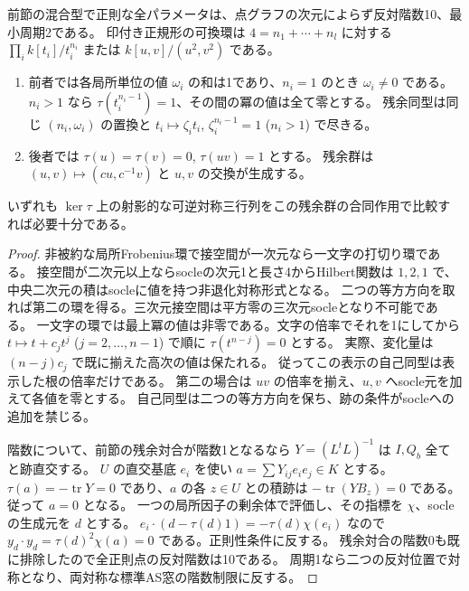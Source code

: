 \begin{proposition}\label{prop:mixed-quartic-normal-forms}
前節の混合型で正則な全パラメータは、点グラフの次元によらず反対階数10、最小周期2である。
印付き正規形の可換環は $4=n_1+\cdots+n_l$ に対する
$\prod_i k[t_i]/t_i^{n_i}$ または $k[u,v]/(u^2,v^2)$ である。
\begin{enumerate}
\item 前者では各局所単位の値 $\omega_i$ の和は1であり、$n_i=1$ のとき $\omega_i\ne0$ である。
$n_i>1$ なら $\tau(t_i^{n_i-1})=1$、その間の冪の値は全て零とする。
残余同型は同じ $(n_i,\omega_i)$ の置換と $t_i\mapsto\zeta_i t_i$, $\zeta_i^{n_i-1}=1$ ($n_i>1$) で尽きる。
\item 後者では $\tau(u)=\tau(v)=0$, $\tau(uv)=1$ とする。
残余群は $(u,v)\mapsto(cu,c^{-1}v)$ と $u,v$ の交換が生成する。
\end{enumerate}
いずれも $\ker\tau$ 上の射影的な可逆対称三行列をこの残余群の合同作用で比較すれば必要十分である。
\end{proposition}
\begin{proof}
非被約な局所Frobenius環で接空間が一次元なら一文字の打切り環である。
接空間が二次元以上ならsocleの次元1と長さ4からHilbert関数は $1,2,1$ で、
中央二次元の積はsocleに値を持つ非退化対称形式となる。
二つの等方方向を取れば第二の環を得る。三次元接空間は平方零の三次元socleとなり不可能である。
一文字の環では最上冪の値は非零である。文字の倍率でそれを1にしてから
$t\mapsto t+c_jt^j$ ($j=2,\ldots,n-1$) で順に $\tau(t^{n-j})=0$ とする。
実際、変化量は $(n-j)c_j$ で既に揃えた高次の値は保たれる。
従ってこの表示の自己同型は表示した根の倍率だけである。
第二の場合は $uv$ の倍率を揃え、$u,v$ へsocle元を加えて各値を零とする。
自己同型は二つの等方方向を保ち、跡の条件がsocleへの追加を禁じる。

階数について、前節の残余対合が階数1となるなら
$Y=(L^t L)^{-1}$ は $I,Q_b$ 全てと跡直交する。
$U$ の直交基底 $e_i$ を使い $a=\sum Y_{ij} e_i e_j\in K$ とする。
$\tau(a)=-\operatorname{tr}Y=0$ であり、$a$ の各 $z\in U$ との積跡は
$-\operatorname{tr}(Y B_z)=0$ である。従って $a=0$ となる。
一つの局所因子の剰余体で評価し、その指標を $\chi$、socleの生成元を $d$ とする。
$e_i\cdot(d-\tau(d)1)=-\tau(d)\chi(e_i)$ なので
$y_d\cdot y_d=\tau(d)^2\chi(a)=0$ である。正則性条件に反する。
残余対合の階数0も既に排除したので全正則点の反対階数は10である。
周期1なら二つの反対位置で対称となり、両対称な標準AS窓の階数制限に反する。
\end{proof}

